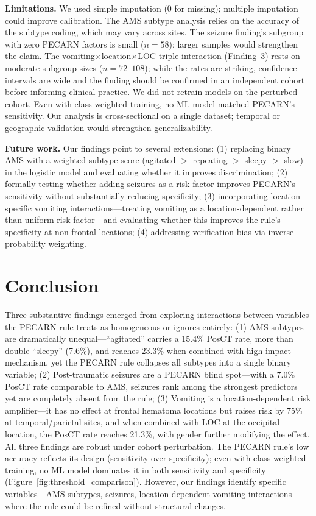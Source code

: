 \documentclass[11pt,letterpaper]{article}
\begin{document}
\textbf{Limitations.} We used simple imputation (0 for missing); multiple imputation could improve calibration. The AMS subtype analysis relies on the accuracy of the subtype coding, which may vary across sites. The seizure finding's subgroup with zero PECARN factors is small ($n=58$); larger samples would strengthen the claim. The vomiting$\times$location$\times$LOC triple interaction (Finding~3) rests on moderate subgroup sizes ($n=72$--$108$); while the rates are striking, confidence intervals are wide and the finding should be confirmed in an independent cohort before informing clinical practice. We did not retrain models on the perturbed cohort. Even with class-weighted training, no ML model matched PECARN's sensitivity. Our analysis is cross-sectional on a single dataset; temporal or geographic validation would strengthen generalizability.

\textbf{Future work.} Our findings point to several extensions: (1) replacing binary AMS with a weighted subtype score (agitated $>$ repeating $>$ sleepy $>$ slow) in the logistic model and evaluating whether it improves discrimination; (2) formally testing whether adding seizures as a risk factor improves PECARN's sensitivity without substantially reducing specificity; (3) incorporating location-specific vomiting interactions---treating vomiting as a location-dependent rather than uniform risk factor---and evaluating whether this improves the rule's specificity at non-frontal locations; (4) addressing verification bias via inverse-probability weighting. 

\section{Conclusion}\label{conclusion}

Three substantive findings emerged from exploring interactions between variables the PECARN rule treats as homogeneous or ignores entirely: (1) AMS subtypes are dramatically unequal---``agitated'' carries a 15.4\% PosCT rate, more than double ``sleepy'' (7.6\%), and reaches 23.3\% when combined with high-impact mechanism, yet the PECARN rule collapses all subtypes into a single binary variable; (2) Post-traumatic seizures are a PECARN blind spot---with a 7.0\% PosCT rate comparable to AMS, seizures rank among the strongest predictors yet are completely absent from the rule; (3) Vomiting is a location-dependent risk amplifier---it has no effect at frontal hematoma locations but raises risk by 75\% at temporal/parietal sites, and when combined with LOC at the occipital location, the PosCT rate reaches 21.3\%, with gender further modifying the effect. All three findings are robust under cohort perturbation. The PECARN rule's low accuracy reflects its design (sensitivity over specificity); even with class-weighted training, no ML model dominates it in both sensitivity and specificity (Figure~\ref{fig:threshold_comparison}). However, our findings identify specific variables---AMS subtypes, seizures, location-dependent vomiting interactions---where the rule could be refined without structural changes.
\end{document}

